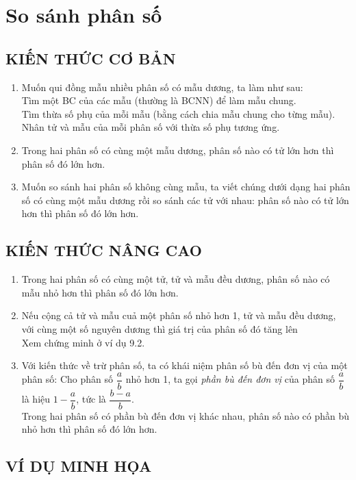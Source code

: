 
\section{So sánh phân số}

\subsection{KIẾN THỨC CƠ BẢN}
\begin{enumerate}
	\item Muốn qui đồng mẫu nhiều phân số có mẫu dương, ta làm như sau:\\
	Tìm một BC của các mẫu (thường là BCNN) để làm mẫu chung.\\
	Tìm thừa số phụ của mỗi mẫu (bằng cách chia mẫu chung cho từng mẫu).\\
	Nhân tử và mẫu của mỗi phân số với thừa số phụ tương ứng.
	\item Trong hai phân số có cùng một mẫu dương, phân số nào có tử lớn hơn thì phân số đó lớn hơn.
	\item Muốn so sánh hai phân số không cùng mẫu, ta viết chúng dưới dạng hai phân số có cùng một mẫu dương rồi so sánh các tử với nhau: phân số nào có tử lớn hơn thì phân số đó lớn hơn.
\end{enumerate}

\subsection{KIẾN THỨC NÂNG CAO}
\begin{enumerate}
	\item Trong hai phân số có cùng một tử, tử và mẫu đều dương, phân số nào có mẫu nhỏ hơn thì phân số đó lớn hơn.
	\item Nếu cộng cả tử và mẫu cuả một phân số nhỏ hơn 1, tử và mẫu đều dương, với cùng một số nguyên dương thì giá trị của phân số đó tăng lên\\
	Xem chứng minh ở ví dụ 9.2. 
	\item Với kiến thức về trừ phân số, ta có khái niệm phân số bù đến đơn vị của một phân số: Cho phân số $\dfrac{a}{b}$ nhỏ hơn 1, ta gọi \textit{phần bù đến đơn vị} của phân số $\dfrac{a}{b}$ là hiệu $1-\dfrac{a}{b}$, tức là $\dfrac{b-a}{b}$.\\
	Trong hai phân số có phần bù đến đơn vị khác nhau, phân số nào có phần bù nhỏ hơn thì phân số đó lớn hơn.
\end{enumerate}
 	
 \subsection{VÍ DỤ MINH HỌA}
	
